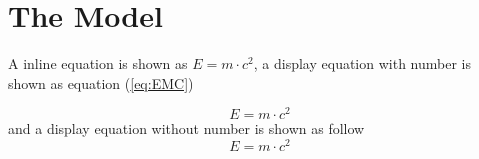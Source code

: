 \section{The Model}\label{sec:model}

A inline equation is shown as $E = m\cdot c^{2}$, a display equation with number is shown as equation (\ref{eq:EMC})

\begin{equation}\label{eq:EMC}
E = m \cdot c^{2}
\end{equation}
and a display equation without number is shown as follow
\[
E=m\cdot c^{2}
\]
